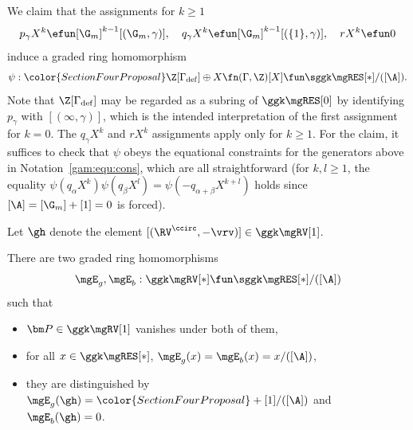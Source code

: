 


We claim that the assignments {\color{SectionFourProposal}for $k\geq1$}
\begin{equation}\label{Gam:ass}
p_\gamma X^k \efun  [\G_m]^{k-1}[(\G_m, \gamma)], \quad q_\gamma X^k \efun  [\G_m]^{k-1}[(\{1\}, \gamma)], \quad r X^k \efun 0
\end{equation}
induce a graded ring homomorphism
\[
\psi : {\color{SectionFourProposal}\Z[\Gamma_{\mathrm{def}}]} \oplus X\fn(\Gamma, \Z)[X] \fun \sggk \mgRES[*] / ([\A]).
\]
Note that {\color{SectionFourProposal}$\Z[\Gamma_{\mathrm{def}}]$} may be regarded as a subring of $\ggk \mgRES[0]$ by identifying $p_\gamma$ with $[(\infty, \gamma)]$, which is the intended interpretation of the first assignment for $k = 0$. {\color{SectionFourProposal}The $q_\gamma X^k$ and $rX^k$ assignments apply only for $k\geq1$.} For the claim, it suffices to check that $\psi$ obeys the equational constraints for the generators above in Notation~\ref{gam:equ:cons}, which are all straightforward ({\color{SectionFourProposal}for $k,l\geq1$, the equality $\psi(q_\alpha X^k)\psi(q_\beta X^l)=\psi(-q_{\alpha+\beta}X^{k+l})$ holds since $[\A]=[\G_m]+[1]=0$ is forced}).



Let $\gh$ denote the element $[(\RV^{\ccirc},  -\vrv)] \in \ggk \mgRV[1]$.

\begin{prop}\label{prop:eu:retr:k}
There are two graded ring homomorphisms
\[
  \mgE_{g}, \mgE_{b}: \ggk \mgRV[*] \fun   \sggk \mgRES[*] / ([\A])
\]
such that
\begin{itemize}
  \item $\bm P \in \ggk \mgRV[1]$ vanishes under both of them,
  \item for all $x \in \ggk \mgRES[*]$, $\mgE_{g}(x) = \mgE_{b}(x) = x/([\A])$,
  \item they are distinguished by $\mgE_{g}(\gh) = {\color{SectionFourProposal}+[1]/([\A])}$ and $\mgE_{b}(\gh) = 0$.
\end{itemize}
\end{prop}

